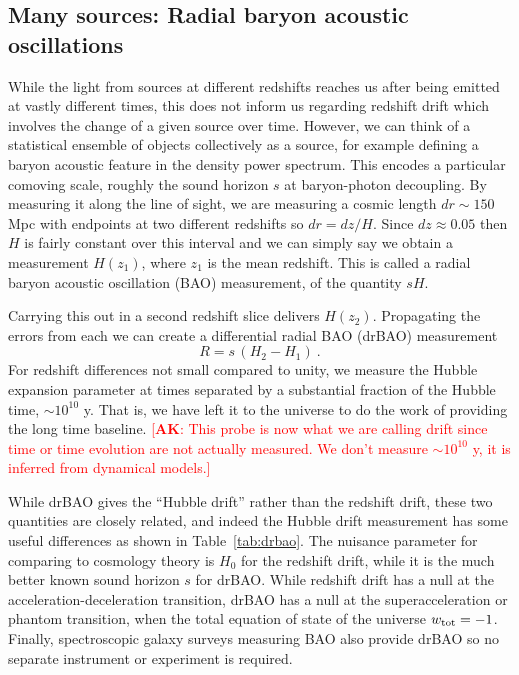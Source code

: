 \documentclass[preprint2, 10pt]{aastex}
\newcommand{\be}{\begin{equation}}
\newcommand{\ee}{\end{equation}}
\newcommand{\alex}[1]{\textcolor{red}{[{\bf AK}: #1]}}
\begin{document}
\subsection{Many sources: Radial baryon acoustic oscillations} \label{sec:rbao} 

While the light from sources at different redshifts reaches us after 
being emitted at vastly different times, this does not inform us regarding 
redshift drift which involves the change of a given source over time.  
However, we can think of a statistical ensemble of objects collectively as 
a source, for example 
defining a baryon acoustic feature in the density power spectrum.  This 
encodes a particular comoving scale, roughly the sound horizon $s$ at 
baryon-photon decoupling.  By measuring it along the line of sight, we 
are measuring a cosmic length $dr\sim150$ Mpc with endpoints at two 
different redshifts so $dr=dz/H$.  Since $dz\approx0.05$ then $H$ is 
fairly constant over this interval and we can simply say we obtain a 
measurement $H(z_1)$, where $z_1$ is the mean redshift.  This is called a 
radial baryon acoustic oscillation (BAO) measurement, of the quantity 
$sH$. 

Carrying this out in a second redshift slice delivers $H(z_2)$.  Propagating 
the errors from each we can create a differential radial BAO (drBAO) 
measurement 
\be 
R=s\,(H_2-H_1) \ . \label{eq:drbao} 
\ee 
For redshift differences not small compared to unity, we measure the 
Hubble expansion parameter at times separated by a substantial fraction 
of the Hubble time, $\sim10^{10}$ y.  That is, we have left it to the universe 
to do the work of providing the long time baseline.  
\alex{This probe is now what we are calling drift since
time or time evolution are not actually measured.  We don't measure
 $\sim10^{10}$ y, it is inferred from dynamical models.}

While drBAO gives the 
``Hubble drift'' rather than the redshift drift, these two quantities are 
closely related, and indeed the Hubble drift measurement has some 
useful differences as shown in Table~\ref{tab:drbao}.  The nuisance 
parameter for comparing to cosmology theory is $H_0$ for the redshift 
drift, while it is the much better known sound horizon $s$ for drBAO.  
While redshift drift has a null at the acceleration-deceleration transition, 
drBAO has a null at the superacceleration or phantom transition, when the 
total equation of state of the universe $w_{\rm tot}=-1$.  Finally, 
spectroscopic galaxy surveys measuring BAO also provide drBAO so no 
separate instrument or experiment is required. 
\end{document}
